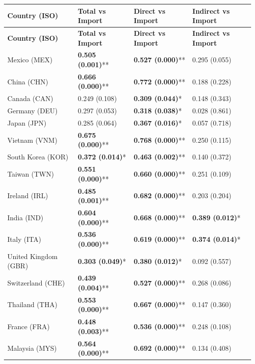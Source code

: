 \begin{longtable}{p{4cm}p{3cm}p{3cm}p{3cm}}
\toprule
\textbf{Country (ISO)} & \textbf{Total vs Import} & \textbf{Direct vs Import} & \textbf{Indirect vs Import} \\
\midrule
\endfirsthead

\toprule
\textbf{Country (ISO)} & \textbf{Total vs Import} & \textbf{Direct vs Import} & \textbf{Indirect vs Import} \\
\midrule
\endhead

\bottomrule
\endfoot

\bottomrule
\endlastfoot

Mexico (MEX) & \textbf{0.505 (0.001)}** & \textbf{0.527 (0.000)}** & 0.295 (0.055) \\
China (CHN) & \textbf{0.666 (0.000)}** & \textbf{0.772 (0.000)}** & 0.188 (0.228) \\
Canada (CAN) & 0.249 (0.108) & \textbf{0.309 (0.044)}* & 0.148 (0.343) \\
Germany (DEU) & 0.297 (0.053) & \textbf{0.318 (0.038)}* & 0.028 (0.861) \\
Japan (JPN) & 0.285 (0.064) & \textbf{0.367 (0.016)}* & 0.057 (0.718) \\
Vietnam (VNM) & \textbf{0.675 (0.000)}** & \textbf{0.768 (0.000)}** & 0.250 (0.115) \\
South Korea (KOR) & \textbf{0.372 (0.014)}* & \textbf{0.463 (0.002)}** & 0.140 (0.372) \\
Taiwan (TWN) & \textbf{0.551 (0.000)}** & \textbf{0.660 (0.000)}** & 0.251 (0.109) \\
Ireland (IRL) & \textbf{0.485 (0.001)}** & \textbf{0.682 (0.000)}** & 0.203 (0.204) \\
India (IND) & \textbf{0.604 (0.000)}** & \textbf{0.668 (0.000)}** & \textbf{0.389 (0.012)}* \\
Italy (ITA) & \textbf{0.536 (0.000)}** & \textbf{0.619 (0.000)}** & \textbf{0.374 (0.014)}* \\
United Kingdom (GBR) & \textbf{0.303 (0.049)}* & \textbf{0.380 (0.012)}* & 0.092 (0.557) \\
Switzerland (CHE) & \textbf{0.439 (0.004)}** & \textbf{0.527 (0.000)}** & 0.268 (0.086) \\
Thailand (THA) & \textbf{0.553 (0.000)}** & \textbf{0.667 (0.000)}** & 0.147 (0.360) \\
France (FRA) & \textbf{0.448 (0.003)}** & \textbf{0.536 (0.000)}** & 0.248 (0.108) \\
Malaysia (MYS) & \textbf{0.564 (0.000)}** & \textbf{0.692 (0.000)}** & 0.134 (0.408) \\

\end{longtable}
